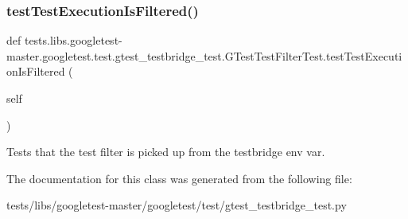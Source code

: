 \subsubsection{\texorpdfstring{test\+Test\+Execution\+Is\+Filtered()}{testTestExecutionIsFiltered()}}
{\footnotesize\ttfamily def tests.\+libs.\+googletest-\/master.\+googletest.\+test.\+gtest\+\_\+testbridge\+\_\+test.\+G\+Test\+Test\+Filter\+Test.\+test\+Test\+Execution\+Is\+Filtered (\begin{DoxyParamCaption}\item[{}]{self }\end{DoxyParamCaption})}

\begin{DoxyVerb}Tests that the test filter is picked up from the testbridge env var.\end{DoxyVerb}
 

The documentation for this class was generated from the following file\+:\begin{DoxyCompactItemize}
\item 
tests/libs/googletest-\/master/googletest/test/gtest\+\_\+testbridge\+\_\+test.\+py\end{DoxyCompactItemize}
